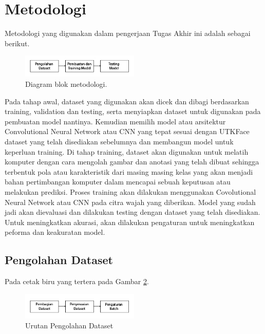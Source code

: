 \section{Metodologi}
\label{sec:arsitektur}


Metodologi yang digunakan dalam pengerjaan Tugas Akhir ini adalah sebagai berikut.
\begin{figure} [ht]
  \centering
  \includegraphics[width=0.5\textwidth]{gambar/metodologi.jpg}

  \caption{Diagram blok metodologi.}
  \label{fig:metodologi}
\end{figure}


Pada tahap awal, dataset yang digunakan akan dicek dan dibagi berdasarkan training, validation dan 
testing, serta menyiapkan dataset untuk digunakan pada pembuatan model nantinya. Kemudian 
memilih model atau arsitektur Convolutional Neural Network atau CNN yang tepat sesuai dengan UTKFace 
dataset yang telah disediakan sebelumnya dan membangun model untuk keperluan training.
Di tahap training, dataset akan digunakan untuk melatih komputer dengan cara mengolah gambar dan anotasi 
yang telah dibuat sehingga terbentuk pola atau karakteristik dari masing masing kelas yang akan 
menjadi bahan pertimbangan komputer dalam mencapai sebuah keputusan atau melakukan prediksi. 
Proses training akan dilakukan menggunakan Covolutional Neural Network atau CNN pada citra wajah 
yang diberikan. Model yang sudah jadi akan dievaluasi dan dilakukan testing dengan dataset
yang telah disediakan. Untuk meningkatkan akurasi, akan dilakukan pengaturan untuk 
meningkatkan peforma dan keakuratan model.


\subsection{Pengolahan Dataset}
\label{subsec:pengolahandataset}

Pada cetak biru yang tertera pada Gambar \ref{fig:pengolahandataset}. \lipsum[8]

\begin{figure} [ht]
  \centering
  \includegraphics[width=0.5\textwidth]{gambar/dataset.jpg}

  \caption{Urutan Pengolahan Dataset}
  \label{fig:pengolahandataset}
\end{figure}

